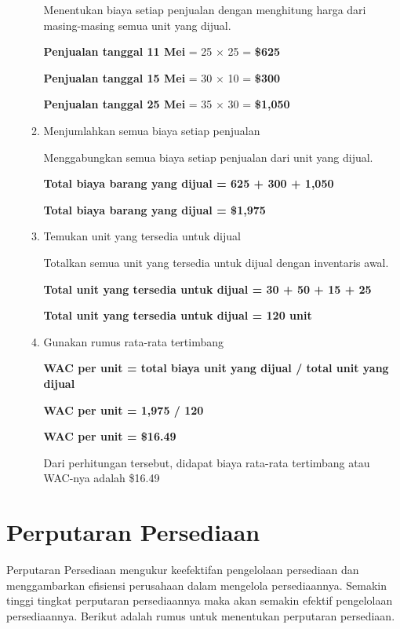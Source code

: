 \begin{enumerate}
\begin{enumerate}
		Menentukan biaya setiap penjualan dengan menghitung harga dari masing-masing semua unit yang dijual.

		\textbf{Penjualan tanggal 11 Mei} = 25 $\times$ 25 = \textbf{\${625}}

		\textbf{Penjualan tanggal 15 Mei} = 30 $\times$ 10 = \textbf{\${300}}

		\textbf{Penjualan tanggal 25 Mei} = 35 $\times$ 30 = \textbf{\${1,050}}

		\item Menjumlahkan semua biaya setiap penjualan
		
		Menggabungkan semua biaya setiap penjualan dari unit yang dijual.

		\textbf{Total biaya barang yang dijual = 625 + 300 + 1,050}

		\textbf{Total biaya barang yang dijual = \${1,975}}

		\item Temukan unit yang tersedia untuk dijual
		
		Totalkan semua unit yang tersedia untuk dijual dengan inventaris awal.

		\textbf{Total unit yang tersedia untuk dijual = 30 + 50 + 15 + 25}

		\textbf{Total unit yang tersedia untuk dijual = 120 unit}

		\item Gunakan rumus rata-rata tertimbang
		
		\textbf{WAC per unit = total biaya unit yang dijual / total unit yang dijual}
		
		\textbf{WAC per unit = 1,975 / 120}
		
		\textbf{WAC per unit = \${16.49}}

		Dari perhitungan tersebut, didapat biaya rata-rata tertimbang atau WAC-nya adalah \${16.49}
	\end{enumerate}
\end{enumerate}

\section{Perputaran Persediaan}

Perputaran Persediaan mengukur keefektifan pengelolaan persediaan dan menggambarkan efisiensi perusahaan dalam mengelola persediaannya. Semakin tinggi tingkat perputaran persediaannya maka akan semakin efektif pengelolaan persediaannya. Berikut adalah rumus untuk menentukan perputaran persediaan.

